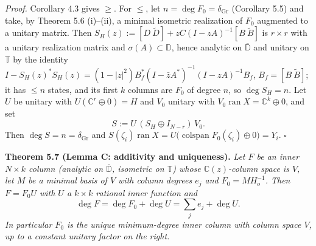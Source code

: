 \documentclass[
  11pt,
  a4paper,
]{article}
\begin{document}
\emph{Proof.} Corollary 4.3 gives \(\ge\). For \(\le\), let
\(n=\deg F_0=\delta_{\mathrm{Gr}}\) (Corollary 5.5) and take, by Theorem
5.6 (i)--(ii), a minimal isometric realization of \(F_0\) augmented to a
unitary matrix. Then
\(S_H(z):=[D\ \tilde D]+zC(I-zA)^{-1}[B\ \tilde B]\) is \(r\times r\)
with a unitary realization matrix and \(\sigma(A)\subset\mathbb D\),
hence analytic on \(\overline{\mathbb D}\) and unitary on \(\mathbb T\)
by the identity
\(I-S_H(z)^*S_H(z)=(1-|z|^2)B_f^*(I-\bar zA^*)^{-1}(I-zA)^{-1}B_f\),
\(B_f=[B\ \tilde B]\); it has \(\le n\) states, and its first \(k\)
columns are \(F_0\) of degree \(n\), so \(\deg S_H=n\). Let \(U\) be
unitary with \(U(\mathbb C^r\oplus0)=H\) and \(V_0\) unitary with
\(V_0\operatorname{ran}X=\mathbb C^k\oplus0\), and set
\[S:=U\,(S_H\oplus I_{N-r})\,V_0 .\] Then
\(\deg S=n=\delta_{\mathrm{Gr}}\) and
\(S(\zeta_i)\operatorname{ran}X=U\bigl(\operatorname{colspan}F_0(\zeta_i)\oplus0\bigr)=Y_i\).
\(\square\)

\textbf{Theorem 5.7 (Lemma C: additivity and uniqueness).} \emph{Let
\(F\) be an inner \(N\times k\) column (analytic on
\(\overline{\mathbb D}\), isometric on \(\mathbb T\)) whose
\(\mathbb C(z)\)-column space is \(V\), let \(M\) be a minimal basis of
\(V\) with column degrees \(e_j\) and \(F_0=MH_o^{-1}\). Then \(F=F_0U\)
with \(U\) a \(k\times k\) rational inner function and}
\[\deg F=\deg F_0+\deg U=\sum_je_j+\deg U .\] \emph{In particular
\(F_0\) is the unique minimum-degree inner column with column space
\(V\), up to a constant unitary factor on the right.}
\end{document}
